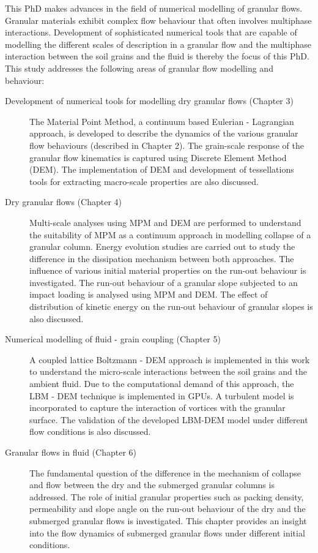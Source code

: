 This PhD makes advances in the field of numerical modelling of granular flows. 
Granular materials exhibit complex flow behaviour that often involves 
multiphase interactions. Development of sophisticated numerical tools that are 
capable of modelling the different scales of description in a granular flow and 
the multiphase interaction between the soil grains and the fluid is thereby the 
focus of this PhD. This study addresses the following areas of granular flow 
modelling and behaviour:
%
\begin{description}
\item[Development of numerical tools for modelling dry granular flows (Chapter 
3)]{The Material Point Method, a continuum based Eulerian - Lagrangian 
approach, is developed to describe the dynamics of the various granular flow 
behaviours (described in Chapter 2). The grain-scale response of the granular 
flow kinematics is captured using Discrete Element Method (DEM). The 
implementation of DEM and development of tessellations tools for extracting 
macro-scale properties are also discussed.}

\item[Dry granular flows (Chapter 4)] {Multi-scale analyses using MPM and DEM 
are performed to understand the suitability of MPM as a continuum approach in 
modelling collapse of a granular column. Energy evolution studies are carried 
out to study the difference in the dissipation mechanism between both 
approaches. The influence of various initial material properties on the run-out 
behaviour is investigated. The run-out behaviour of a granular slope subjected 
to an impact loading is analysed using MPM and DEM. The effect of distribution 
of kinetic energy on the run-out behaviour of granular slopes is also 
discussed.}

\item[Numerical modelling of fluid - grain coupling (Chapter 5)]{A coupled 
lattice Boltzmann - DEM approach is implemented in this work to understand the 
micro-scale interactions between the soil grains and the ambient fluid. Due to 
the computational demand of this approach, the LBM - DEM technique is 
implemented in GPUs. A turbulent model is incorporated to capture the
interaction of vortices with the granular surface. The validation of 
the developed LBM-DEM model under different flow conditions is also discussed.}

\item[Granular flows in fluid (Chapter 6)]{The fundamental question of the 
difference in the mechanism of collapse and flow between the dry and the 
submerged granular columns is addressed. The role of initial granular 
properties such as packing density, permeability and slope angle on the run-out 
behaviour of the dry and the submerged granular flows is investigated. This 
chapter provides an insight into the flow dynamics of submerged granular flows 
under different initial conditions.
}
\end{description}
